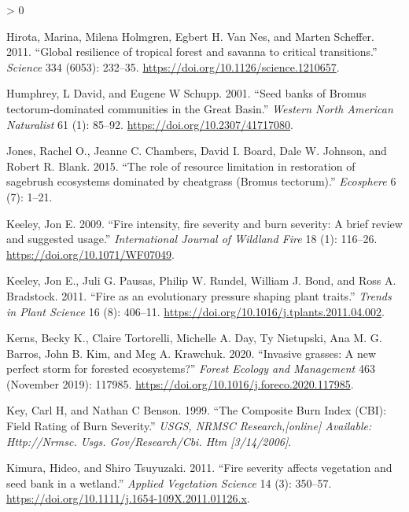 \documentclass[
  12pt,
]{article}
\newlength{\cslhangindent}
\newenvironment{CSLReferences}[2] %
 {%
  \setlength{\parindent}{0pt}
  \ifodd #1 \everypar{\setlength{\hangindent}{\cslhangindent}}\ignorespaces\fi
  \ifnum #2 > 0
  \setlength{\parskip}{#2\baselineskip}
  \fi
 }%
 {}
\begin{document}
\begin{CSLReferences}{1}{0}
\leavevmode\hypertarget{ref-Hirota2011}{}%
Hirota, Marina, Milena Holmgren, Egbert H. Van Nes, and Marten Scheffer.
2011. {``{Global resilience of tropical forest and savanna to critical
transitions}.''} \emph{Science} 334 (6053): 232--35.
\url{https://doi.org/10.1126/science.1210657}.

\leavevmode\hypertarget{ref-Humphrey2001}{}%
Humphrey, L David, and Eugene W Schupp. 2001. {``{Seed banks of Bromus
tectorum-dominated communities in the Great Basin}.''} \emph{Western
North American Naturalist} 61 (1): 85--92.
\url{https://doi.org/10.2307/41717080}.

\leavevmode\hypertarget{ref-Jones2015}{}%
Jones, Rachel O., Jeanne C. Chambers, David I. Board, Dale W. Johnson,
and Robert R. Blank. 2015. {``{The role of resource limitation in
restoration of sagebrush ecosystems dominated by cheatgrass (Bromus
tectorum)}.''} \emph{Ecosphere} 6 (7): 1--21.

\leavevmode\hypertarget{ref-Keeley2009}{}%
Keeley, Jon E. 2009. {``{Fire intensity, fire severity and burn
severity: A brief review and suggested usage}.''} \emph{International
Journal of Wildland Fire} 18 (1): 116--26.
\url{https://doi.org/10.1071/WF07049}.

\leavevmode\hypertarget{ref-Keeley2011}{}%
Keeley, Jon E., Juli G. Pausas, Philip W. Rundel, William J. Bond, and
Ross A. Bradstock. 2011. {``{Fire as an evolutionary pressure shaping
plant traits}.''} \emph{Trends in Plant Science} 16 (8): 406--11.
\url{https://doi.org/10.1016/j.tplants.2011.04.002}.

\leavevmode\hypertarget{ref-Kerns2020}{}%
Kerns, Becky K., Claire Tortorelli, Michelle A. Day, Ty Nietupski, Ana
M. G. Barros, John B. Kim, and Meg A. Krawchuk. 2020. {``{Invasive
grasses: A new perfect storm for forested ecosystems?}''} \emph{Forest
Ecology and Management} 463 (November 2019): 117985.
\url{https://doi.org/10.1016/j.foreco.2020.117985}.

\leavevmode\hypertarget{ref-Key1999}{}%
Key, Carl H, and Nathan C Benson. 1999. {``The Composite Burn Index
(CBI): Field Rating of Burn Severity.''} \emph{USGS, NRMSC
Research,{[}online{]} Available: Http://Nrmsc. Usgs. Gov/Research/Cbi.
Htm {[}3/14/2006{]}}.

\leavevmode\hypertarget{ref-Kimura2011}{}%
Kimura, Hideo, and Shiro Tsuyuzaki. 2011. {``{Fire severity affects
vegetation and seed bank in a wetland}.''} \emph{Applied Vegetation
Science} 14 (3): 350--57.
\url{https://doi.org/10.1111/j.1654-109X.2011.01126.x}.


\end{CSLReferences}
\end{document}
